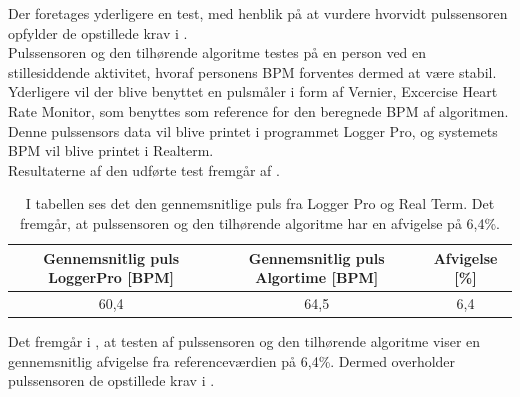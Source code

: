 Der foretages yderligere en test, med henblik på at vurdere hvorvidt pulssensoren opfylder de opstillede krav i . \\
Pulssensoren og den tilhørende algoritme testes på en person ved en stillesiddende aktivitet, hvoraf personens BPM forventes dermed at være stabil. Yderligere vil der blive benyttet en pulsmåler i form af Vernier, Excercise Heart Rate Monitor, som benyttes som reference for den beregnede BPM af algoritmen. Denne pulssensors data vil blive printet i programmet Logger Pro, og systemets BPM vil blive printet i Realterm. \\
Resultaterne af den udførte test fremgår af .
\begin{table}[H]
	\centering
	\begin{tabular}{ccc} \hline
		\rowcolor[HTML]{C0C0C0} 
			Gennemsnitlig puls LoggerPro {[}BPM{]} & Gennemsnitlig puls Algortime {[}BPM{]} & Afvigelse {[}\%{]} \\ \hline
			60,4 & 64,5 & 6,4 \\ \hline
		\end{tabular}%
	\caption{I tabellen ses det den gennemsnitlige puls fra Logger Pro og Real Term. Det fremgår, at pulssensoren og den tilhørende algoritme har en afvigelse på 6,4\%.}
	\label{tab:test_pulssystem}
\end{table} \vspace{-0.5cm}
Det fremgår i , at testen af pulssensoren og den tilhørende algoritme viser en gennemsnitlig afvigelse fra referenceværdien på 6,4\%. Dermed overholder pulssensoren de opstillede krav i .